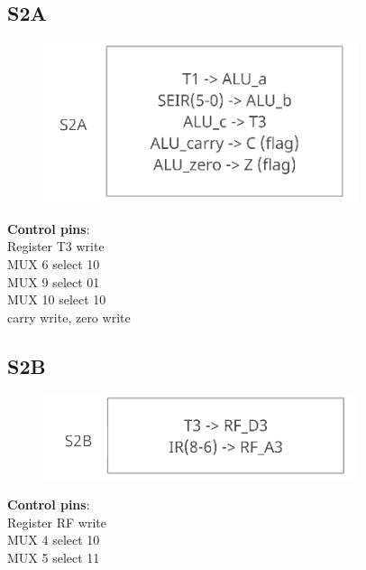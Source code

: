 \documentclass[11pt, fleqn]{article}
\begin{document}
\bigskip

\subsection*{\centering S2A}
\begin{figure}[H]
    \centering
    \includegraphics{DataPath/DataPath_S2A.PNG}
\end{figure}
\begin{center}
\textbf{Control pins}: \\
Register T3 write \\
MUX 6 select 10 \\
MUX 9 select 01 \\
MUX 10 select 10 \\
carry write, zero write \\
\end{center}

\bigskip

\subsection*{\centering S2B}
\begin{figure}[H]
    \centering
    \includegraphics{DataPath/DataPath_S2B.PNG}
\end{figure}
\begin{center}
\textbf{Control pins}: \\
Register RF write \\
MUX 4 select 10 \\
MUX 5 select 11 \\
\end{center}

\bigskip
\end{document}

